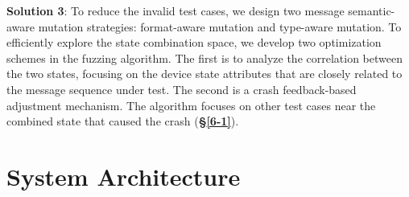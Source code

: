 \documentclass[10pt,journal,compsoc]{IEEEtran}
\begin{document}
\noindent \checkmark \; \textbf{Solution 3}: To reduce the invalid test cases, we design two message semantic-aware mutation strategies: format-aware mutation and type-aware mutation. To efficiently explore the state combination space, we develop two optimization schemes in the fuzzing algorithm. The first is to analyze the correlation between the two states, focusing on the device state attributes that are closely related to the message sequence under test. The second is a crash feedback-based adjustment mechanism. The algorithm focuses on other test cases near the combined state that caused the crash (\textbf{\S\ref{6-1}}).


\section{System Architecture} \label{sa}
\end{document}
